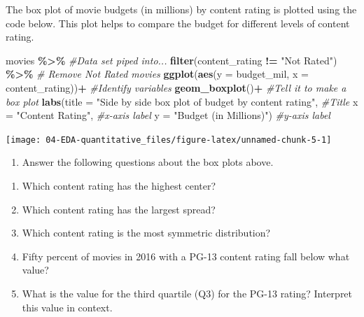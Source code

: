 \documentclass[
]{report}
\newenvironment{Shaded}{\begin{snugshade}}{\end{snugshade}}
\newcommand{\CommentTok}[1]{\textcolor[rgb]{0.56,0.35,0.01}{\textit{#1}}}
\newcommand{\DataTypeTok}[1]{\textcolor[rgb]{0.13,0.29,0.53}{#1}}
\newcommand{\KeywordTok}[1]{\textcolor[rgb]{0.13,0.29,0.53}{\textbf{#1}}}
\newcommand{\NormalTok}[1]{#1}
\newcommand{\OperatorTok}[1]{\textcolor[rgb]{0.81,0.36,0.00}{\textbf{#1}}}
\newcommand{\StringTok}[1]{\textcolor[rgb]{0.31,0.60,0.02}{#1}}
\providecommand{\tightlist}{%
  \setlength{\itemsep}{0pt}\setlength{\parskip}{0pt}}
\begin{document}
The box plot of movie budgets (in millions) by content rating is plotted using the code below. This plot helps to compare the budget for different levels of content rating.

\begin{Shaded}
\begin{Highlighting}[]
\NormalTok{movies }\OperatorTok{\%\textgreater{}\%}\StringTok{  }\CommentTok{\#Data set piped into...}
\StringTok{  }\KeywordTok{filter}\NormalTok{(content\_rating }\OperatorTok{!=}\StringTok{ "Not Rated"}\NormalTok{) }\OperatorTok{\%\textgreater{}\%}\StringTok{ }\CommentTok{\# Remove Not Rated movies}
\StringTok{  }\KeywordTok{ggplot}\NormalTok{(}\KeywordTok{aes}\NormalTok{(}\DataTypeTok{y =}\NormalTok{ budget\_mil, }\DataTypeTok{x =}\NormalTok{ content\_rating))}\OperatorTok{+}\StringTok{  }\CommentTok{\#Identify variables}
\StringTok{  }\KeywordTok{geom\_boxplot}\NormalTok{()}\OperatorTok{+}\StringTok{  }\CommentTok{\#Tell it to make a box plot}
\StringTok{  }\KeywordTok{labs}\NormalTok{(}\DataTypeTok{title =} \StringTok{"Side by side box plot of budget by content rating"}\NormalTok{,  }\CommentTok{\#Title}
       \DataTypeTok{x =} \StringTok{"Content Rating"}\NormalTok{,    }\CommentTok{\#x{-}axis label}
       \DataTypeTok{y =} \StringTok{"Budget (in Millions)"}\NormalTok{)  }\CommentTok{\#y{-}axis label}
\end{Highlighting}
\end{Shaded}

\begin{center}\texttt{[image: 04-EDA-quantitative\_files/figure-latex/unnamed-chunk-5-1]} \end{center}

\begin{enumerate}
\def\labelenumi{\arabic{enumi}.}
\setcounter{enumi}{11}
\tightlist
\item
  Answer the following questions about the box plots above.
\end{enumerate}

\begin{enumerate}
\def\labelenumi{\alph{enumi}.}
\item
  Which content rating has the highest center?
  \vspace{0.2in}
\item
  Which content rating has the largest spread?
  \vspace{0.2in}
\item
  Which content rating is the most symmetric distribution?
  \vspace{0.2in}
\item
  Fifty percent of movies in 2016 with a PG-13 content rating fall below what value?
  \vspace{0.2in}
\item
  What is the value for the third quartile (Q3) for the PG-13 rating? Interpret this value in context.
  \vspace{.8in}
\end{enumerate}
\end{document}
